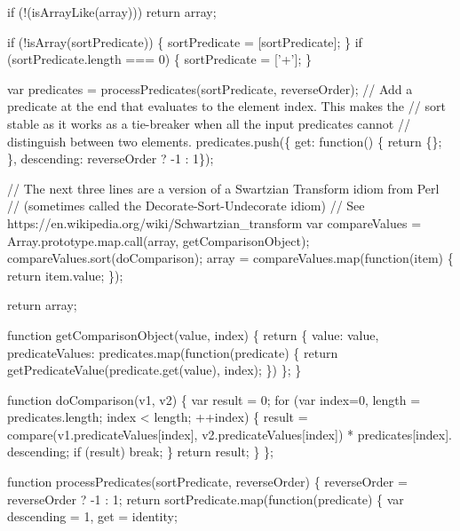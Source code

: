 \begin{DoxyCodeInclude}
{{{{    \textcolor{keywordflow}{if} (!(isArrayLike(array))) \textcolor{keywordflow}{return} array;

    \textcolor{keywordflow}{if} (!isArray(sortPredicate)) \{ sortPredicate = [sortPredicate]; \}
    \textcolor{keywordflow}{if} (sortPredicate.length === 0) \{ sortPredicate = [\textcolor{charliteral}{'+'}]; \}

    var predicates = processPredicates(sortPredicate, reverseOrder);
    \textcolor{comment}{// Add a predicate at the end that evaluates to the element index. This makes the}
    \textcolor{comment}{// sort stable as it works as a tie-breaker when all the input predicates cannot}
    \textcolor{comment}{// distinguish between two elements.}
    predicates.push(\{ \textcolor{keyword}{get}: \textcolor{keyword}{function}() \{ \textcolor{keywordflow}{return} \{\}; \}, descending: reverseOrder ? -1 : 1\});

    \textcolor{comment}{// The next three lines are a version of a Swartzian Transform idiom from Perl}
    \textcolor{comment}{// (sometimes called the Decorate-Sort-Undecorate idiom)}
    \textcolor{comment}{// See https://en.wikipedia.org/wiki/Schwartzian\_transform}
    var compareValues = Array.prototype.map.call(array, getComparisonObject);
    compareValues.sort(doComparison);
    array = compareValues.map(\textcolor{keyword}{function}(item) \{ \textcolor{keywordflow}{return} item.value; \});

    \textcolor{keywordflow}{return} array;

    \textcolor{keyword}{function} getComparisonObject(value, index) \{
      \textcolor{keywordflow}{return} \{
        value: value,
        predicateValues: predicates.map(\textcolor{keyword}{function}(predicate) \{
          \textcolor{keywordflow}{return} getPredicateValue(predicate.get(value), index);
        \})
      \};
    \}

    \textcolor{keyword}{function} doComparison(v1, v2) \{
      var result = 0;
      \textcolor{keywordflow}{for} (var index=0, length = predicates.length; index < length; ++index) \{
        result = compare(v1.predicateValues[index], v2.predicateValues[index]) * predicates[index].
      descending;
        \textcolor{keywordflow}{if} (result) \textcolor{keywordflow}{break};
      \}
      \textcolor{keywordflow}{return} result;
    \}
  \};

  \textcolor{keyword}{function} processPredicates(sortPredicate, reverseOrder) \{
    reverseOrder = reverseOrder ? -1 : 1;
    \textcolor{keywordflow}{return} sortPredicate.map(\textcolor{keyword}{function}(predicate) \{
      var descending = 1, \textcolor{keyword}{get} = identity;

}}}}
\end{DoxyCodeInclude}
